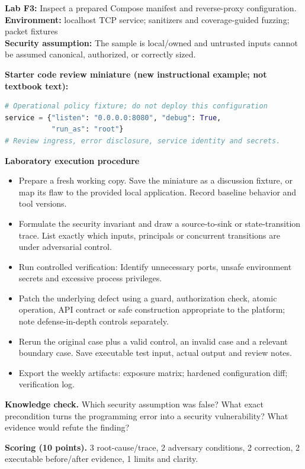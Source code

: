 \documentclass[10pt,letterpaper]{article}
\begin{document}
\begin{insight}\textbf{Lab F3:} Inspect a prepared Compose manifest and reverse-proxy configuration.\\\textbf{Environment:} localhost TCP service; sanitizers and coverage-guided fuzzing; packet fixtures\\\textbf{Security assumption:} The sample is local/owned and untrusted inputs cannot be assumed canonical, authorized, or correctly sized.\end{insight}
\textbf{Starter code review miniature (new instructional example; not textbook text):}
\begin{lstlisting}[language=Python]
# Operational policy fixture; do not deploy this configuration
service = {"listen": "0.0.0.0:8080", "debug": True,
           "run_as": "root"}
# Review ingress, error disclosure, service identity and secrets.
\end{lstlisting}
\textbf{Laboratory execution procedure}
\begin{itemize}[leftmargin=*,itemsep=2pt]
\item Prepare a fresh working copy. Save the miniature as a discussion fixture, or map its flaw to the provided local application. Record baseline behavior and tool versions.
\item Formulate the security invariant and draw a source-to-sink or state-transition trace. List exactly which inputs, principals or concurrent transitions are under adversarial control.
\item Run controlled verification: Identify unnecessary ports, unsafe environment secrets and excessive process privileges.
\item Patch the underlying defect using a guard, authorization check, atomic operation, API contract or safe construction appropriate to the platform; note defense-in-depth controls separately.
\item Rerun the original case plus a valid control, an invalid case and a relevant boundary case. Save executable test input, actual output and review notes.
\item Export the weekly artifacts: exposure matrix; hardened configuration diff; verification log.
\end{itemize}
\textbf{Knowledge check.} Which security assumption was false? What exact precondition turns the programming error into a security vulnerability? What evidence would refute the finding?

\textbf{Scoring (10 points).} 3 root-cause/trace, 2 adversary conditions, 2 correction, 2 executable before/after evidence, 1 limits and clarity.
\end{document}
